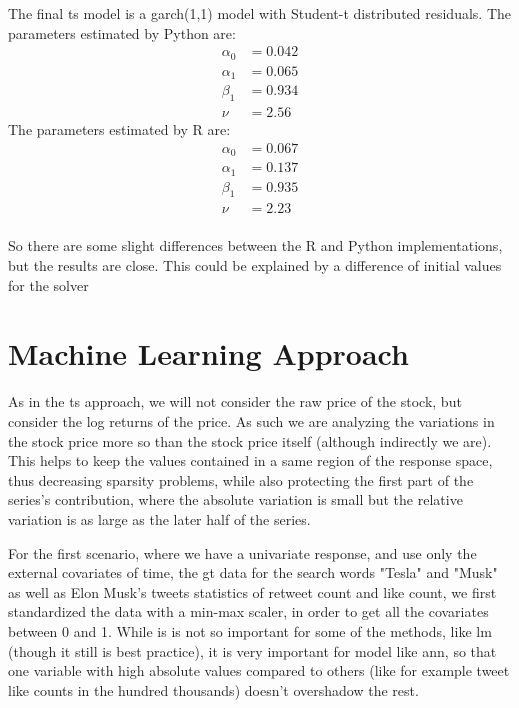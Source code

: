 The final \acrshort{ts} model is a \acrshort{garch}(1,1) model with Student-t distributed residuals. The parameters estimated by Python are:
\begin{align*}
\alpha_0 &= 0.042 \\
\alpha_1 &= 0.065 \\
\beta_1 &= 0.934 \\
\nu &= 2.56
\end{align*}
The parameters estimated by R are:
\begin{align*}
\alpha_0 &= 0.067 \\
\alpha_1 &= 0.137 \\
\beta_1 &= 0.935 \\
\nu &= 2.23 \\
\end{align*}

So there are some slight differences between the R and Python implementations, but the results are close. This could be explained by a difference of initial values for the solver


\section{Machine Learning Approach}
As in the \acrshort{ts} approach, we will not consider the raw price of the stock, but consider the log returns of the price. As such we are analyzing the variations in the stock price more so than the stock price itself (although indirectly we are). This helps to keep the values contained in a same region of the response space, thus decreasing sparsity problems, while also protecting the first part of the series's contribution, where the absolute variation is small but the relative variation is as large as the later half of the series.

For the first scenario,  where we have a univariate response, and use only the external covariates of time, the \acrlong{gt} data for the search words "Tesla" and "Musk" as well as Elon Musk's tweets statistics of retweet count and like count, we first standardized the data with a min-max scaler, in order to get all the covariates between 0 and 1. While is is not so important for some of the methods, like \acrlong{lm} (though it still is best practice), it is very important for model like \acrshort{ann}, so that one variable with high absolute values compared to others (like for example tweet like counts in the hundred thousands) doesn't overshadow the rest.



